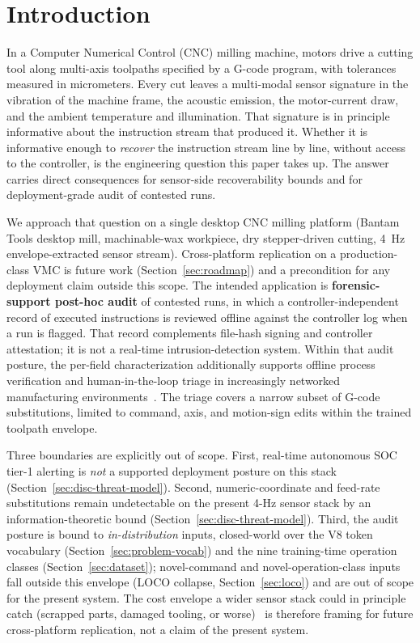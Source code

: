 \documentclass[sensors,article,submit,moreauthors,pdftex]{Definitions/mdpi}
\begin{document}
\section{Introduction}
\label{sec:introduction}

In a Computer Numerical Control (CNC) milling machine, motors drive a cutting tool along multi-axis toolpaths specified by a G-code program, with tolerances measured in micrometers. Every cut leaves a multi-modal sensor signature in the vibration of the machine frame, the acoustic emission, the motor-current draw, and the ambient temperature and illumination. That signature is in principle informative about the instruction stream that produced it. Whether it is informative enough to \emph{recover} the instruction stream line by line, without access to the controller, is the engineering question this paper takes up. The answer carries direct consequences for sensor-side recoverability bounds and for deployment-grade audit of contested runs.

We approach that question on a single desktop CNC milling platform (Bantam Tools desktop mill, machinable-wax workpiece, dry stepper-driven cutting, 4~Hz envelope-extracted sensor stream). Cross-platform replication on a production-class VMC is future work (Section~\ref{sec:roadmap}) and a precondition for any deployment claim outside this scope. The intended application is \textbf{forensic-support post-hoc audit} of contested runs, in which a controller-independent record of executed instructions is reviewed offline against the controller log when a run is flagged. That record complements file-hash signing and controller attestation; it is not a real-time intrusion-detection system. Within that audit posture, the per-field characterization additionally supports offline process verification and human-in-the-loop triage in increasingly networked manufacturing environments~\cite{nist2023sp80082,nist2024fmnet,sturm2014cyber,yampolskiy2018security,zhong2017intelligent,kimmell2025cnc}. The triage covers a narrow subset of G-code substitutions, limited to command, axis, and motion-sign edits within the trained toolpath envelope.

Three boundaries are explicitly out of scope. First, real-time autonomous SOC tier-1 alerting is \emph{not} a supported deployment posture on this stack (Section~\ref{sec:disc-threat-model}). Second, numeric-coordinate and feed-rate substitutions remain undetectable on the present 4-Hz sensor stack by an information-theoretic bound (Section~\ref{sec:disc-threat-model}). Third, the audit posture is bound to \emph{in-distribution} inputs, closed-world over the V8 token vocabulary (Section~\ref{sec:problem-vocab}) and the nine training-time operation classes (Section~\ref{sec:dataset}); novel-command and novel-operation-class inputs fall outside this envelope (LOCO collapse, Section~\ref{sec:loco}) and are out of scope for the present system. The cost envelope a wider sensor stack could in principle catch (scrapped parts, damaged tooling, or worse)~\cite{teti2010advanced,serin2020tool} is therefore framing for future cross-platform replication, not a claim of the present system.
\end{document}
